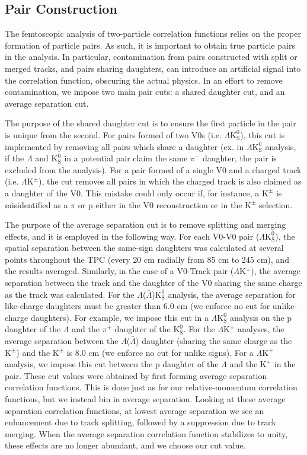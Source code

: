 \documentclass[ALICE,manyauthors]{cernphprep}
\newcommand{\Lam}{$\Lambda$\xspace}
\newcommand{\LamALam}{$\Lambda$($\bar{\Lambda}$)\xspace}
\newcommand{\KchP}{$\mathrm{K^{+}}$\xspace}
\newcommand{\Kpm}{$\mathrm{K^{\pm}}$\xspace}
\newcommand{\Ks}{$\mathrm{K^{0}_{S}}$\xspace}
\newcommand{\LamKchP}{$\Lambda\mathrm{K^{+}}$\xspace}
\newcommand{\LamKpm}{$\Lambda\mathrm{K^{\pm}}$\xspace}
\newcommand{\LamKs}{$\Lambda\mathrm{K^{0}_{S}}$\xspace}
\newcommand{\LamALamKs}{$\Lambda$($\bar{\Lambda}$)$\mathrm{K^{0}_{S}}$\xspace}
\begin{document}
\subsection{Pair Construction}
\label{PairConstruction}
The femtoscopic analysis of two-particle correlation functions relies on the proper formation of particle pairs.
As such, it is important to obtain true particle pairs in the analysis.  
In particular, contamination from pairs constructed with split or merged tracks, and pairs sharing daughters, can introduce an artificial signal into the correlation function, obscuring the actual physics.  
In an effort to remove contamination, we impose two main pair cuts: a shared daughter cut, and an average separation cut.  

The purpose of the shared daughter cut is to ensure the first particle in the pair is unique from the second.  
For pairs formed of two V0s (i.e. \LamKs), this cut is implemented by removing all pairs which share a daughter (ex. in \LamKs analysis, if the \Lam and \Ks in a potential pair claim the same $\pi^{-}$ daughter, the pair is excluded from the analysis).  
For a pair formed of a single V0 and a charged track (i.e. \LamKpm), the cut removes all pairs in which the charged track is also claimed as a daughter of the V0.  
This mistake could only occur if, for instance, a \Kpm is misidentified as a $\pi$ or p either in the V0 reconstruction or in the \Kpm selection.

The purpose of the average separation cut is to remove splitting and merging effects, and it is employed in the following way.  
For each V0-V0 pair (\LamKs), the spatial separation between the same-sign daughters was calculated at several points throughout the TPC (every 20 cm radially from 85 cm to 245 cm), and the results averaged.
Similarly, in the case of a V0-Track pair (\LamKpm), the average separation between the track and the daughter of the V0 sharing the same charge as the track was calculated.
For the \LamALamKs analysis, the average separation for like-charge daughters must be greater than 6.0 cm (we enforce no cut for unlike-charge daughters).  
For example, we impose this cut in a \LamKs analysis on the p daughter of the \Lam and the $\pi^{+}$ daughter of the \Ks.  
For the \LamKpm analyses, the average separation between the \LamALam daughter (sharing the same charge as the \Kpm) and the \Kpm is 8.0 cm (we enforce no cut for unlike signs).  
For a \LamKchP analysis, we impose this cut between the p daughter of the \Lam and the \KchP in the pair.
These cut values were obtained by first forming average separation correlation functions.
This is done just as for our relative-momentum correlation functions, but we instead bin in average separation.
Looking at these average separation correlation functions, at lowest average separation we see an enhancement due to track splitting, followed by a suppression due to track merging.
When the average separation correlation function stabilizes to unity, these effects are no longer abundant, and we choose our cut value.
\end{document}
